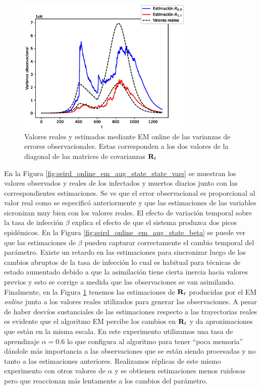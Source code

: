 \begin{figure}[h]
    \centering
    \includegraphics[width=0.75\textwidth]{figs/seird_online_em_aug_state_R.eps}
    \caption{Valores reales y estimados mediante EM online de las varianzas de errores observacionales. Estas corresponden a los dos valores de la diagonal de las matrices de covarianzas $\mathbf{R}_t$}
    \label{fig:seird_online_em_aug_state_R}
\end{figure}

En la Figura \ref{fig:seird_online_em_aug_state_state_vars} se muestran los valores observados y reales de los infectados y muertos diarios junto con las correspondientes estimaciones. Se ve que el error observacional es proporcional al valor real como se especificó anteriormente y que las estimaciones de las variables sicronizan muy bien con los valores reales. El efecto de variación temporal sobre la tasa de infección $\beta$ explica el efecto de que el sistema produzca dos picos epidémicos. En la Figura \ref{fig:seird_online_em_aug_state_beta} se puede ver que las estimaciones de $\beta$ pueden capturar correctamente el cambio temporal del parámetro. Existe un retardo en las estimaciones para sincronizar luego de los cambios abruptos de la tasa de infección lo cual es habitual para técnicas de estado aumentado debido a que la asimilación tiene cierta inercia hacia valores previos y esto se corrige a medida que las observaciones se van asimilando. Finalmente, en la Figura \ref{fig:seird_online_em_aug_state_R} tenemos las estimaciones de $\mathbf{R}_t$ producidas por el EM \textit{online} junto a los valores reales utilizados para generar las observaciones. A pesar de haber desvíos sustanciales de las estimaciones respecto a las trayectorias reales es evidente que el algoritmo EM percibe los cambios en $\mathbf{R}_t$ y da aproximaciones que están en la misma escala. En este experimento utilizamos una tasa de aprendizaje $\alpha = 0.6$ lo que configura al algoritmo para tener ``poca memoria'' dándole más importancia a las observaciones que se están siendo procesadas y no tanto a las estimaciones anteriores. Realizamos réplicas de este mismo experimento con otros valores de $\alpha$ y se obtienen estimaciones menos ruidosas pero que reaccionan más lentamente a los cambios del parámetro.

